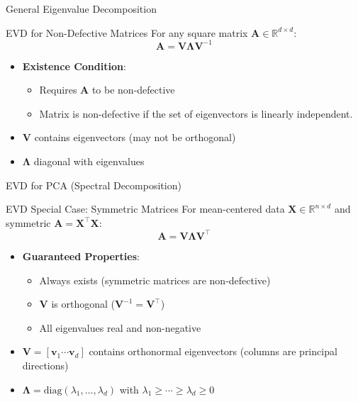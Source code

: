 \documentclass{beamer}
\begin{document}
\begin{frame}{General Eigenvalue Decomposition}
    \begin{block}{EVD for Non-Defective Matrices}
        For any square matrix $\mathbf{A} \in \mathbb{R}^{d \times d}$:
        \[
        \mathbf{A} = \mathbf{V}\boldsymbol{\Lambda}\mathbf{V}^{-1}
        \]
        \begin{itemize}
            \item \textbf{Existence Condition}:
            \begin{itemize}
                \item Requires $\mathbf{A}$ to be non-defective
                \item Matrix is non-defective if the set of eigenvectors is linearly independent.
            \end{itemize}
            \item $\mathbf{V}$ contains eigenvectors (may not be orthogonal)
            \item $\boldsymbol{\Lambda}$ diagonal with eigenvalues
        \end{itemize}
    \end{block}
\end{frame}

\begin{frame}{EVD for PCA (Spectral Decomposition)}
    \begin{block}{EVD Special Case: Symmetric Matrices}
        For mean-centered data $\mathbf{X} \in \mathbb{R}^{n \times d}$ and symmetric $\mathbf{A} = \mathbf{X}^\top\mathbf{X}$:
        \[
        \mathbf{A} = \mathbf{V}\boldsymbol{\Lambda}\mathbf{V}^\top
        \]
        \begin{itemize}
            \item \textbf{Guaranteed Properties}:
            \begin{itemize}
                \item Always exists (symmetric matrices are non-defective)
                \item $\mathbf{V}$ is orthogonal ($\mathbf{V}^{-1} = \mathbf{V}^\top$)
                \item All eigenvalues real and non-negative
            \end{itemize}
            \item $\mathbf{V} = [\mathbf{v}_1 \cdots \mathbf{v}_d]$ contains orthonormal eigenvectors (columns are principal directions)
            \item $\boldsymbol{\Lambda} = \text{diag}(\lambda_1, \ldots, \lambda_d)$ with $\lambda_1 \geq \cdots \geq \lambda_d \geq 0$
        \end{itemize}
    \end{block}
\end{frame}
\end{document}

